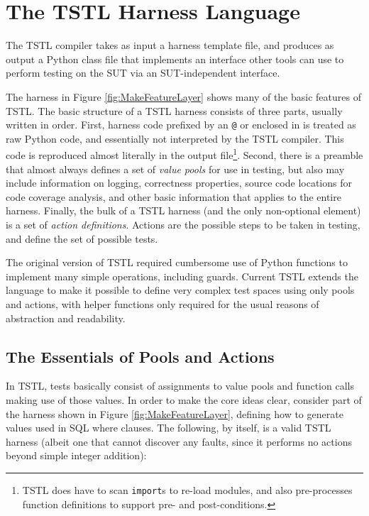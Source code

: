 \section{The TSTL Harness Language}
\label{sec:lang}

The TSTL compiler takes as input a harness template file, and produces
as output a Python class file that implements an interface other tools
can use to perform testing on the SUT via an SUT-independent interface.

The harness in Figure \ref{fig:MakeFeatureLayer} shows many of the
basic features of TSTL.  The basic structure of a TSTL harness
consists of three parts, usually written in order.  First, harness
code prefixed by an {\tt @} or enclosed in {\tt <@ @>} is treated as
raw Python code, and essentially not interpreted by the TSTL
compiler.  This code is reproduced almost literally in the output
file\footnote{TSTL does have to scan {\tt import}s to re-load modules, and also pre-processes function
  definitions to support
pre- and post-conditions.}.  Second, there is a preamble that almost
always defines a set of \emph{value pools} for use in testing, but
also may include information on logging, correctness properties,
source code locations for code coverage analysis, and other basic
information that applies to the entire harness.  Finally, the bulk of
a TSTL harness (and the only non-optional element) is a set of
\emph{action definitions}.  Actions are the possible steps to be taken in
testing, and define the set of possible tests.

The original version of TSTL \cite{NFM15} required cumbersome use of Python
functions to implement many simple operations, including guards.  Current TSTL extends
the language to make it possible to define very complex test spaces
using only pools and actions, with helper functions only required for
the usual reasons of abstraction and readability.

\subsection{The Essentials of Pools and Actions}

In TSTL, tests basically consist of assignments to value pools and
function calls making use of those values.  In order to make the core ideas clear,
consider part of the harness shown in Figure \ref{fig:MakeFeatureLayer}, defining how to
generate values used in SQL where clauses.  The following, by itself,
is a valid TSTL harness (albeit one that cannot discover any
faults, since it performs no actions beyond simple integer addition):

